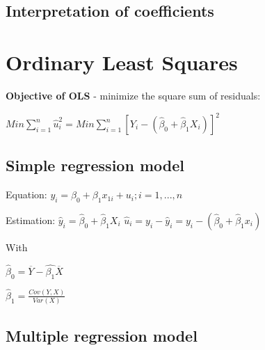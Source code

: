 \documentclass[10pt,landscape]{article}
\begin{document}
\begin{multicols}{3}
\subsection*{Interpretation of coefficients}


\section*{Ordinary Least Squares}


\textbf{Objective of OLS} - minimize the square sum of residuals:

$Min \sum_{i=1}^n \hat{u}_i^2 = Min \sum_{i=1}^n [Y_i - (\hat{\beta}_0 + \hat{\beta}_1 X_i)]^2$


\subsection*{Simple regression model}

Equation:
$y_i = \beta_0 + \beta_1 x_{1i} + u_i; i = 1, ..., n$

Estimation:
$\hat{y}_i = \hat{\beta}_0 + \hat{\beta}_1 X_i$
$\hat{u}_i = y_i - \hat{y}_i = y_i - (\hat{\beta}_0 + \hat{\beta}_1 x_i)$


With

$\hat{\beta}_0 = \overline{Y} - \hat{\beta_1} \overline{X}$

$\hat{\beta}_1 = \frac{Cov(Y, X)}{Var(X)}$

\subsection*{Multiple regression model}


\end{multicols}
\end{document}
